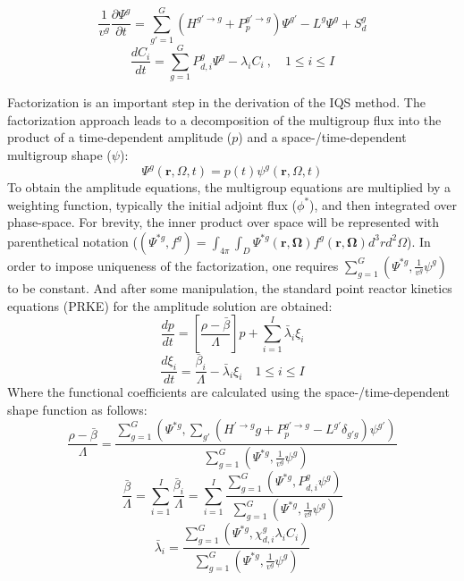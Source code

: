 \documentclass{anstrans}
\renewcommand{\vec}[1]{\bm{#1}} %
\newcommand{\bs}[1]{\mathbf{#1}}
\renewcommand{\div}{\bs{\nabla}\! \cdot \!}
\newcommand{\grad}{\bs{\nabla}}
\newcommand{\be}{\begin{equation}}
\newcommand{\ee}{\end{equation}}
\begin{document}
\be
\frac{1}{v^g}\frac{\partial \Psi^g}{\partial t} = \sum_{g'=1}^G \left(H^{g'\to g} + P_p^{g' \to g} \right) \Psi^{g'} - L^g\Psi^g + S_{d}^g
\ee 
\label{eq:flux}
\be
\frac{dC_i}{dt} = \sum_{g=1}^G P_{d,i}^g \Psi^{g} - \lambda_i C_i \ , \quad 1 \le i \le I 
\label{eq:precursor}
\ee

Factorization is an important step in the derivation of the IQS method. The factorization approach leads to a decomposition of the multigroup flux into the product of a time-dependent amplitude ($p$) and a space-/time-dependent multigroup shape ($\psi$):
\be
\Psi^g(\vec{r},\Omega,t)=p(t)\psi^g(\vec{r},\Omega,t)
\ee
To obtain the amplitude equations, the multigroup equations are multiplied by a weighting function, typically the initial adjoint flux ($\phi^*$), and then integrated over phase-space.  For brevity, the inner product over space will be represented with parenthetical notation ($\left(\Psi^{*g},f^g\right) = \int_{4\pi}\int_D \Psi^{*g}(\vec{r},\vec{\Omega})f^g(\vec{r},\vec{\Omega})d^3r d^2\Omega
$).  In order to impose uniqueness of the factorization, one requires $\sum_{g=1}^G\left(\Psi^{*g},\frac{1}{v^g}\psi^g\right)$ to be constant.  And after some manipulation, the standard point reactor kinetics equations (PRKE) for the amplitude solution are obtained:
\be
\frac{dp}{dt}=\left[\frac{\rho-\bar{\beta}}{\Lambda}\right]p+\sum_{i=1}^I\bar{\lambda}_i\xi_i
\ee
\be
\frac{d\xi_i}{dt}=\frac{\bar{\beta}_i}{\Lambda}-\bar{\lambda}_i\xi_i \quad 1 \le i \le I 
\ee
Where the functional coefficients are calculated using the space-/time-dependent shape function as follows:
\be
\frac{\rho-\bar{\beta}}{\Lambda}=\frac{ \sum_{g=1}^G\left(\Psi^{*g},\sum_{g'}(H^{' \to g}g+P_p^{g' \to g}-L^{g'}\delta_{g'g})\psi^{g'}\right)}{\sum_{g=1}^G\left(\Psi^{*g},\frac{1}{v^g}\psi^g\right)}
\label{eq:rmb}
\ee
\be
\frac{\bar{\beta}}{\Lambda}=\sum_{i=1}^I\frac{\bar{\beta}_i}{\Lambda}=\sum_{i=1}^I\frac{\sum_{g=1}^G(\Psi^{*g}, P_{d,i}^g \psi^g)}{\sum_{g=1}^G\left(\Psi^{*g},\frac{1}{v^g}\psi^g\right)}
\ee
\be
\bar{\lambda}_i=\frac{\sum_{g=1}^G(\Psi^{*g},\chi_{d,i}^g\lambda_i C_i)}{\sum_{g=1}^G\left(\Psi^{*g},\frac{1}{v^g}\psi^g\right)}
\label{eq:l}
\ee
\end{document}
